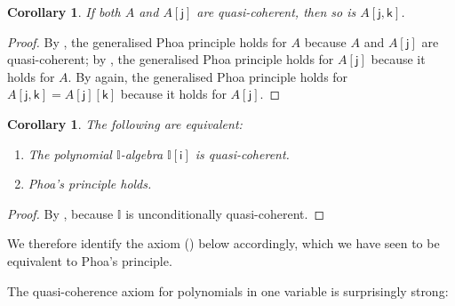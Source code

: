\documentclass[a4paper,12pt]{amsart}
\newtheorem{lemma}[theorem]{Lemma}
\newtheorem{corollary}[theorem]{Corollary}
\theoremstyle{definition}
\newcommand{\mbb}[1]{\mathbb{#1}}
\newcommand{\I}{\mbb I}
\newcommand{\ms}[1]{\mathsf{#1}}
\begin{document}
\begin{corollary}\label{cor:A-and-Ax-qc-to-Axy-qc}
  If both $A$ and $A[\ms{j}]$ are quasi-coherent, then so is $A[\ms{j},\ms{k}]$.
\end{corollary}
\begin{proof}
  By , the generalised Phoa principle holds for $A$ because $A$ and $A[\ms{j}]$ are quasi-coherent; by , the generalised Phoa principle holds for $A[\ms{j}]$ because it holds for $A$.  By  again, the generalised Phoa principle holds for $A[\ms{j},\ms{k}] = A[\ms{j}][\ms{k}]$ because it holds for $A[\ms{j}]$.
\end{proof}

\begin{corollary}\label{cor:phoa-vs-quasicoherence}
  The following are equivalent:
  \begin{enumerate}
    \item The polynomial $\I$-algebra $\I[\ms{i}]$ is quasi-coherent.
    \item Phoa's principle holds.
  \end{enumerate}
\end{corollary}

\begin{proof}
  By , because $\I$ is unconditionally quasi-coherent.
\end{proof}


We therefore identify the axiom (\AxiomSQCP) below accordingly, which we have seen to be equivalent to Phoa's principle.

\PrintAxiomSQCP


The quasi-coherence axiom for polynomials in one variable is surprisingly strong:

\end{document}
